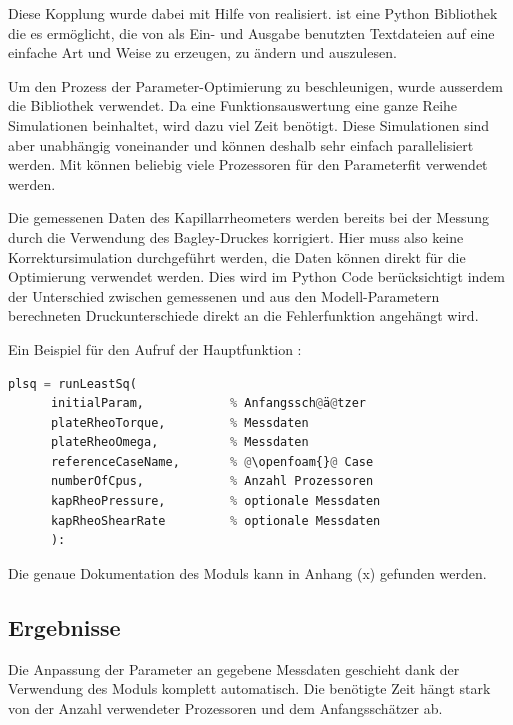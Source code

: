 Diese Kopplung wurde dabei mit Hilfe von  \cite{pyfoam} realisiert.  ist eine Python Bibliothek die es ermöglicht, die von \openfoam{} als Ein- und Ausgabe benutzten Textdateien auf eine einfache Art und Weise zu erzeugen, zu ändern und auszulesen.

Um den Prozess der Parameter-Optimierung zu beschleunigen, wurde ausserdem die Bibliothek  \cite{parallelpython} verwendet. Da eine Funktionsauswertung eine ganze Reihe Simulationen beinhaltet, wird dazu viel Zeit benötigt. Diese Simulationen sind aber unabhängig voneinander und können deshalb sehr einfach parallelisiert werden. Mit  können beliebig viele Prozessoren für den Parameterfit verwendet werden.

Die gemessenen Daten des Kapillarrheometers werden bereits bei der Messung durch die Verwendung des Bagley-Druckes korrigiert. Hier muss also keine Korrektursimulation durchgeführt werden, die Daten können direkt für die Optimierung verwendet werden. Dies wird im Python Code berücksichtigt indem der Unterschied zwischen gemessenen und aus den Modell-Parametern berechneten Druckunterschiede direkt an die Fehlerfunktion angehängt wird.

Ein Beispiel für den Aufruf der Hauptfunktion :
\begin{lstlisting}[language=Python]
plsq = runLeastSq(
      initialParam,            % Anfangssch@ä@tzer
      plateRheoTorque,         % Messdaten
      plateRheoOmega,          % Messdaten
      referenceCaseName,       % @\openfoam{}@ Case
      numberOfCpus,            % Anzahl Prozessoren
      kapRheoPressure,         % optionale Messdaten
      kapRheoShearRate         % optionale Messdaten
      ):  
\end{lstlisting}
%
Die genaue Dokumentation des Moduls kann in Anhang (x)  gefunden werden.
%
\subsection{Ergebnisse}
Die Anpassung der Parameter an gegebene Messdaten geschieht dank der Verwendung des  Moduls komplett automatisch. 
Die benötigte Zeit hängt stark von der Anzahl verwendeter Prozessoren und dem Anfangsschätzer ab.
%
